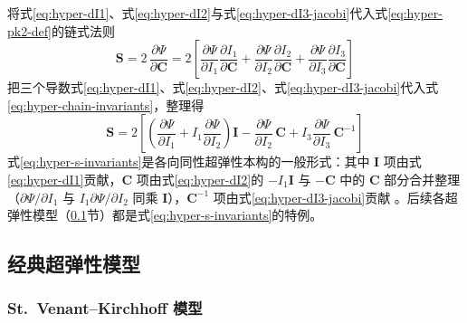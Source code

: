 将式\eqref{eq:hyper-dI1}、式\eqref{eq:hyper-dI2}与式\eqref{eq:hyper-dI3-jacobi}代入式\eqref{eq:hyper-pk2-def}的链式法则
\begin{equation}
  \mathbf{S}=2\,\frac{\partial\hat{\Psi}}{\partial\mathbf{C}}
  =2\left[\frac{\partial\Psi}{\partial I_1}\frac{\partial I_1}{\partial\mathbf{C}}
  +\frac{\partial\Psi}{\partial I_2}\frac{\partial I_2}{\partial\mathbf{C}}
  +\frac{\partial\Psi}{\partial I_3}\frac{\partial I_3}{\partial\mathbf{C}}\right]
  \label{eq:hyper-chain-invariants}
\end{equation}
把三个导数式\eqref{eq:hyper-dI1}、式\eqref{eq:hyper-dI2}、式\eqref{eq:hyper-dI3-jacobi}代入式\eqref{eq:hyper-chain-invariants}，整理得
\begin{equation}
  \mathbf{S}=2\left[\left(\frac{\partial\Psi}{\partial I_1}+I_1\frac{\partial\Psi}{\partial I_2}\right)\mathbf{I}
  -\frac{\partial\Psi}{\partial I_2}\,\mathbf{C}
  +I_3\frac{\partial\Psi}{\partial I_3}\,\mathbf{C}^{-1}\right]
  \label{eq:hyper-s-invariants}
\end{equation}
式\eqref{eq:hyper-s-invariants}是各向同性超弹性本构的一般形式：其中 $\mathbf{I}$ 项由式\eqref{eq:hyper-dI1}贡献，$\mathbf{C}$ 项由式\eqref{eq:hyper-dI2}的 $-I_1\mathbf{I}$ 与 $-\mathbf{C}$ 中的 $\mathbf{C}$ 部分合并整理（$\partial\Psi/\partial I_1$ 与 $I_1\partial\Psi/\partial I_2$ 同乘 $\mathbf{I}$），$\mathbf{C}^{-1}$ 项由式\eqref{eq:hyper-dI3-jacobi}贡献 \cite{Ogden1997,Ogden1972}。后续各超弹性模型（\ref{sec:hyper-models}节）都是式\eqref{eq:hyper-s-invariants}的特例。

\subsection{经典超弹性模型}\label{sec:hyper-models}

\subsubsection{St.~Venant--Kirchhoff 模型}

